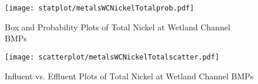         \begin{figure}[hb]   %
            \centering
            \texttt{[image: statplot/metalsWCNickelTotalprob.pdf]}
            \caption{Box and Probability Plots of Total Nickel at Wetland Channel BMPs}
        \end{figure}         %
        
        
        \begin{figure}[hb]   %
            \centering
            \texttt{[image: scatterplot/metalsWCNickelTotalscatter.pdf]}
            \caption{Influent vs. Effluent Plots of Total Nickel at Wetland Channel BMPs}
        \end{figure}         %
        \clearpage
        